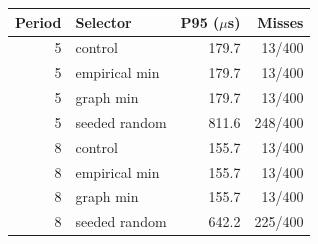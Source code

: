 \begin{tabular}{rlrr}
\toprule
Period & Selector & P95 ($\mu$s) & Misses \\
\midrule
5 & control & 179.7 & 13/400 \\
5 & empirical min & 179.7 & 13/400 \\
5 & graph min & 179.7 & 13/400 \\
5 & seeded random & 811.6 & 248/400 \\
8 & control & 155.7 & 13/400 \\
8 & empirical min & 155.7 & 13/400 \\
8 & graph min & 155.7 & 13/400 \\
8 & seeded random & 642.2 & 225/400 \\
\bottomrule
\end{tabular}
